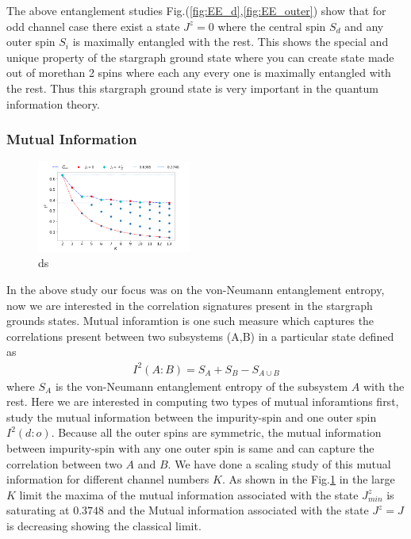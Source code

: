 \documentclass[reprint,prb,superscriptaddress]{revtex4-2}
\begin{document}
\par The above entanglement studies Fig.(\ref{fig:EE_d},\ref{fig:EE_outer}) show  that for odd channel case there exist a state $J^z=0$ where the central spin $S_d$ and any outer spin $S_i$ is maximally entangled with the rest. This shows the special and unique property of the stargraph ground state where you can create state made out of morethan 2 spins where each any every one is maximally entangled with the rest. Thus this stargraph ground state is very important in the quantum information theory. 

\subsubsection{Mutual Information}

\begin{figure}[!htpb]
\includegraphics[width=0.45\textwidth]{plt/NEW31Dec_I_2_vs_Nch_[0,1]}
\caption{ds}
\label{fig:MI_d_o}
\end{figure}
\noindent In the above study our focus was on the von-Neumann entanglement entropy, now we are interested in the correlation signatures present in the stargraph grounds states. Mutual inforamtion is one such measure which captures the correlations present between two subsystems (A,B) in a particular state defined as
\begin{eqnarray}
I^2(A:B)=S_A+S_B-S_{A\cup B}
\end{eqnarray}
where $S_{A}$ is the von-Neumann entanglement entropy of the subsystem $A$ with the rest. Here we are interested in computing two types of mutual inforamtions first, study the mutual information between the impurity-spin and one outer spin $I^2(d:o)$. Because all the outer spins are symmetric, the mutual information between impurity-spin with any one outer spin is same and can capture the correlation between two $A$ and $B$. We have done a scaling study of this mutual information for different channel numbers $K$. As shown in the Fig.\ref{fig:MI_d_o} in the large $K$ limit the maxima of the mutual information associated with the state $J^z_{min}$ is saturating at $0.3748$ and the Mutual information associated with the state $J^z=J$ is decreasing showing the classical limit.
\end{document}
